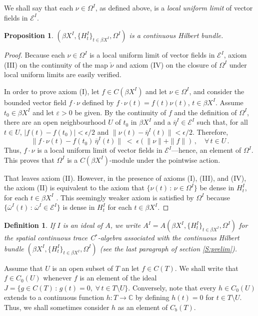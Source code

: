 \documentclass{amsart}
\newtheorem{proposition}[theorem]{Proposition}
\newtheorem{definition}[theorem]{Definition}
\theoremstyle{definition}
\theoremstyle{remark}
\begin{document}
We shall say that each $\nu\in\Omega^I$, as defined above, is a \emph{local uniform limit} of vector fields in $\mathcal E^I$.

\begin{proposition}\label{prop: ext chb}
$(\beta X^I, \{H_t^I\}_{t\in \beta X^I},\Omega^{I})$ is a continuous Hilbert bundle.
\end{proposition}

\begin{proof}
Because each $\nu\in\Omega^I$ is a local uniform limit of vector fields in $\mathcal E^I$, axiom (III)
on the continuity of the map $\check{\nu}$
and axiom (IV) on the closure of $\Omega^I$ under local uniform limits are easily verified.

In order to prove axiom (I),
let $f\in C(\beta X^I)$ and let $\nu\in \Omega^I$,
and consider the bounded vector field $f\cdot\nu$ defined by $f\cdot\nu(t)=f(t)\nu(t)$, $t\in\beta X^I$. Assume $t_0\in\beta X^I$ and let $\varepsilon>0$
be given. By the continuity of $f$ and the definition of $\Omega^I$, there are
an open neighbourhood $U$ of $t_0$ in $\beta X^I$ and a $\overline\eta^I\in\mathcal E^I$
such that, for all $t\in U$,
$|f(t)-f(t_0)|<\epsilon/2$ and $\|\nu(t)-\overline \eta^I(t)\|< \epsilon/2$. Therefore,
\[
\|f\cdot\nu(t)-f(t_0)\, \overline \eta^I(t)\|\;<\;  \epsilon (\|\nu\|+\|f\|)\,,\quad\forall\,t\in U\,.
\]
Thus, $f\cdot \nu$ is a local uniform limit of vector fields in $\mathcal E^I$---hence, an element of $\Omega^I$.
This proves that $\Omega^I$ is a $C(\beta X^I)$-module under the pointwise action.

That leaves axiom (II).
However, in the presence of axioms (I), (III), and (IV), the axiom (II)
is equivalent to the axiom that $\{\nu(t)\,:\,\nu\in\Omega^I\}$ be dense in $H_{t}^I$, for each $t\in \beta X^I$ \cite{dixmier--douady1963}. This
seemingly weaker axiom is satisfied by $\Omega^I$ because
$\{\overline\omega^I(t)\,:\,\overline\omega^I\in\mathcal E^I\}$ is dense in $H_{t}^I$ for each $t\in \beta X^I$.
\end{proof}

\begin{definition} If $I$ is an ideal of $A$, we write
$A^I=A(\beta X^I, \{H_t^I\}_{t\in \beta X^I},\Omega^{I})$ for the spatial continuous trace C$^*$-algebra
associated with the continuous Hilbert bundle $(\beta X^I, \{H_t^I\}_{t\in \beta X^I},\Omega^{I})$
(see the last paragraph of section \ref{S:prelim}).
\end{definition}

\vskip  4pt
 Assume that $U$ is an open subset of $T$ an let $f\in C(T)$. We shall write that $f\in C_0(U)$ 
whenever $f$ is an element  of the ideal $J=\{g\in C(T)\,:\,g(t)=0,\;\forall\,t\in T\setminus U\}$. Conversely, note that every $h\in C_0(U)$ extends to a continuous function $h:T\rightarrow \mathbb C$
by defining $h(t)=0$ for $t\in T\setminus U$. Thus, we shall sometimes consider $h$ as an element of $C_b(T)$.
\end{document}
